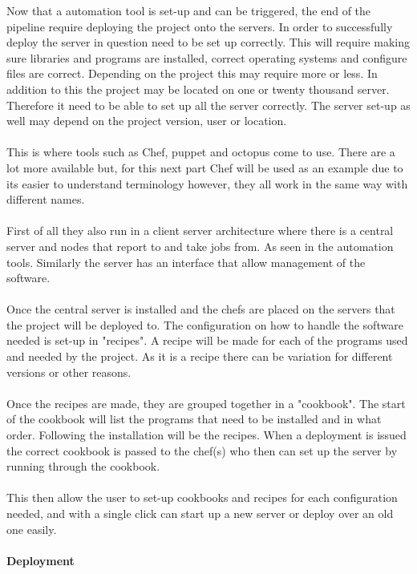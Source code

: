 Now that a automation tool is set-up and can be triggered, the end of the pipeline require deploying the project onto the servers. In order to successfully deploy the server in question need to be set up correctly. This will require making sure libraries and programs are installed, correct operating systems and configure files are correct. Depending on the project this may require more or less.  In addition to this the project may be located on one or twenty thousand server. Therefore it need to be able to set up all the server correctly. The server set-up as well may depend on the project version, user or location. 
\\\\
This is where tools such as Chef, puppet and octopus come to use. There are a lot more available but, for this next part Chef will be used as an example due to its easier to understand terminology however, they all work in the same way with different names.
\\\\
First of all they also run in a client server architecture where there is a central server and nodes that report to and take jobs from. As seen in the automation tools. Similarly the server has an interface that allow management of the software.
\\\\
Once the central server is installed and the chefs are placed on the servers that the project will be deployed to. The configuration on how to handle the software needed is set-up in "recipes". A recipe will be made for each of the programs used and needed by the project. As it is a recipe there can be variation for different versions or other reasons.
\\\\
Once the recipes are made, they are grouped together in a "cookbook". The start of the cookbook will list the programs that need to be installed and in what order. Following the installation will be the recipes. When a deployment is issued the correct cookbook is passed to the chef(s) who then can set up the server by running through the cookbook.
\\\\
This then allow the user to set-up cookbooks and recipes for each configuration needed, and with a single click can start up a new server or deploy over an old one easily.

\paragraph{Deployment}

